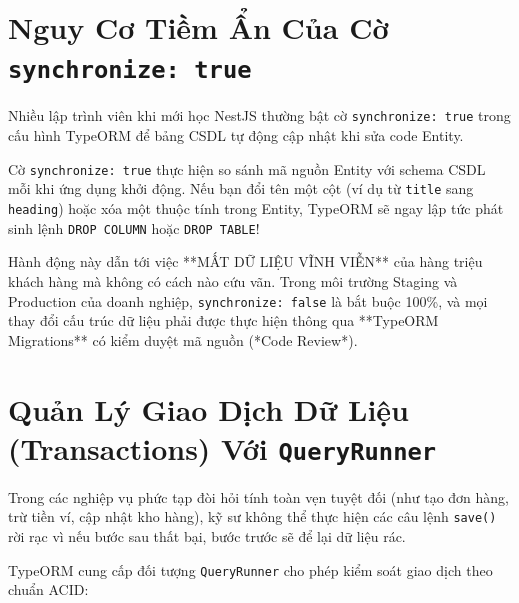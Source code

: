 \documentclass[12pt,a4paper,oneside]{book}
\begin{document}
\section{Nguy Cơ Tiềm Ẩn Của Cờ \texttt{synchronize: true}}
Nhiều lập trình viên khi mới học NestJS thường bật cờ \texttt{synchronize: true} trong cấu hình TypeORM để bảng CSDL tự động cập nhật khi sửa code Entity.

\begin{warningbox}
  Cờ \texttt{synchronize: true} thực hiện so sánh mã nguồn Entity với schema CSDL mỗi khi ứng dụng khởi động. Nếu bạn đổi tên một cột (ví dụ từ \texttt{title} sang \texttt{heading}) hoặc xóa một thuộc tính trong Entity, TypeORM sẽ ngay lập tức phát sinh lệnh \texttt{DROP COLUMN} hoặc \texttt{DROP TABLE}!
  
  Hành động này dẫn tới việc **MẤT DỮ LIỆU VĨNH VIỄN** của hàng triệu khách hàng mà không có cách nào cứu vãn. Trong môi trường Staging và Production của doanh nghiệp, \texttt{synchronize: false} là bắt buộc 100\%, và mọi thay đổi cấu trúc dữ liệu phải được thực hiện thông qua **TypeORM Migrations** có kiểm duyệt mã nguồn (*Code Review*).
\end{warningbox}

\section{Quản Lý Giao Dịch Dữ Liệu (Transactions) Với \texttt{QueryRunner}}
Trong các nghiệp vụ phức tạp đòi hỏi tính toàn vẹn tuyệt đối (như tạo đơn hàng, trừ tiền ví, cập nhật kho hàng), kỹ sư không thể thực hiện các câu lệnh \texttt{save()} rời rạc vì nếu bước sau thất bại, bước trước sẽ để lại dữ liệu rác.

TypeORM cung cấp đối tượng \texttt{QueryRunner} cho phép kiểm soát giao dịch theo chuẩn ACID:
\end{document}
